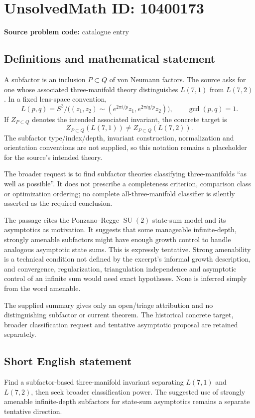 \documentclass[11pt]{article}
\begin{document}
\section*{UnsolvedMath ID: 10400173}
\textbf{Source problem code:} catalogue entry
\subsection{Definitions and mathematical statement}
A subfactor is an inclusion \(P\subset Q\) of von Neumann factors. The source asks for one whose associated three-manifold theory distinguishes \(L(7,1)\) from \(L(7,2)\). In a fixed lens-space convention,
\[
 L(p,q)=S^3/\bigl((z_1,z_2)\sim
 (e^{2\pi i/p}z_1,e^{2\pi iq/p}z_2)\bigr),\qquad\gcd(p,q)=1.
\]
If \(Z_{P\subset Q}\) denotes the intended associated invariant, the concrete target is
\[
 Z_{P\subset Q}(L(7,1))\ne Z_{P\subset Q}(L(7,2)).
\]
The subfactor type/index/depth, invariant construction, normalization and orientation conventions are not supplied, so this notation remains a placeholder for the source's intended theory.

The broader request is to find subfactor theories classifying three-manifolds ``as well as possible''. It does not prescribe a completeness criterion, comparison class or optimization ordering; no complete all-three-manifold classifier is silently asserted as the required conclusion.

The passage cites the Ponzano--Regge \(\operatorname{SU}(2)\) state-sum model and its asymptotics as motivation. It suggests that some manageable infinite-depth, strongly amenable subfactors might have enough growth control to handle analogous asymptotic state sums. This is expressly tentative. Strong amenability is a technical condition not defined by the excerpt's informal growth description, and convergence, regularization, triangulation independence and asymptotic control of an infinite sum would need exact hypotheses. None is inferred simply from the word amenable.

The supplied summary gives only an open/triage attribution and no distinguishing subfactor or current theorem. The historical concrete target, broader classification request and tentative asymptotic proposal are retained separately.
\subsection{Short English statement}
Find a subfactor-based three-manifold invariant separating \(L(7,1)\) and \(L(7,2)\), then seek broader classification power. The suggested use of strongly amenable infinite-depth subfactors for state-sum asymptotics remains a separate tentative direction.
\end{document}
